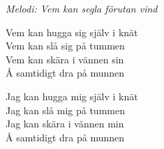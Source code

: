 {\footnotesize\textit{Melodi: Vem kan segla förutan vind}}\par
\vspace{10pt}
Vem kan hugga sig själv i knät\\
Vem kan slå sig på tummen\\
Vem kan skära i vännen sin\\
Å samtidigt dra på munnen\par
\vspace{10pt}
Jag kan hugga mig själv i knät\\
Jag kan slå mig på tummen\\
Jag kan skära i vännen min\\
Å samtidigt dra på munnen
